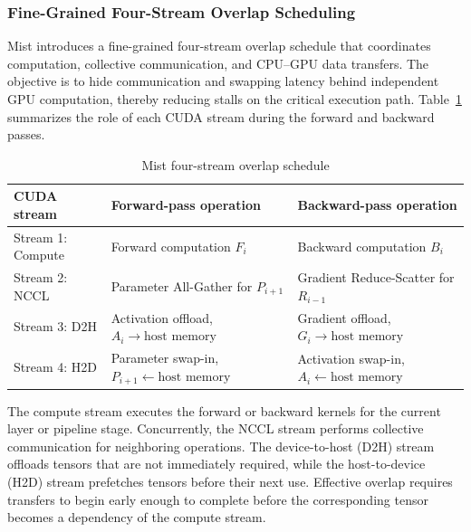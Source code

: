 \documentclass[11pt,journal,final, onecolumn]{IEEEtran}
\begin{document}
\subsubsection{Fine-Grained Four-Stream Overlap Scheduling}
\label{subsubsec:mist-overlap-scheduling}
Mist introduces a fine-grained four-stream overlap schedule that coordinates
computation, collective communication, and CPU--GPU data transfers. The
objective is to hide communication and swapping latency behind independent GPU
computation, thereby reducing stalls on the critical execution path.
Table~\ref{tab:mist-four-stream-schedule} summarizes the role of each CUDA
stream during the forward and backward passes.

\begin{table}[htbp]
    \centering
    \caption{Mist four-stream overlap schedule}
    \label{tab:mist-four-stream-schedule}
    \footnotesize
    \renewcommand{\arraystretch}{1.25}
    \begin{tabularx}{\textwidth}{
            >{\raggedright\arraybackslash}p{}
            >{\raggedright\arraybackslash}X
            >{\raggedright\arraybackslash}X
        }
        \toprule
        \textbf{CUDA stream}
         & \textbf{Forward-pass operation}
         & \textbf{Backward-pass operation}        \\
        \midrule

        Stream 1: Compute
         & Forward computation \(F_i\)
         & Backward computation \(B_i\)            \\

        Stream 2: NCCL
         & Parameter All-Gather for \(P_{i+1}\)
         & Gradient Reduce-Scatter for \(R_{i-1}\) \\

        Stream 3: D2H
         & Activation offload,
        \(A_i \rightarrow \text{host memory}\)
         & Gradient offload,
        \(G_i \rightarrow \text{host memory}\)     \\

        Stream 4: H2D
         & Parameter swap-in,
        \(P_{i+1} \leftarrow \text{host memory}\)
         & Activation swap-in,
        \(A_i \leftarrow \text{host memory}\)      \\

        \bottomrule
    \end{tabularx}
\end{table}

The compute stream executes the forward or backward kernels for the current
layer or pipeline stage. Concurrently, the NCCL stream performs collective
communication for neighboring operations. The device-to-host (D2H) stream
offloads tensors that are not immediately required, while the host-to-device
(H2D) stream prefetches tensors before their next use. Effective overlap
requires transfers to begin early enough to complete before the corresponding
tensor becomes a dependency of the compute stream.
\end{document}
